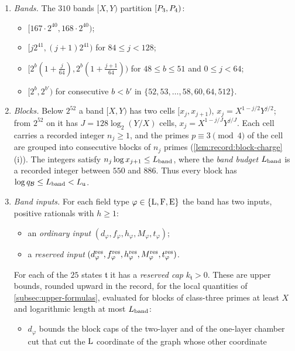 \begin{definition}\label{def:record:upper-bands}
\leavevmode
\begin{enumerate}[label=(\alph*)]
\item \emph{Bands.} The $310$ bands $[X,Y)$ partition $[P_3,P_4)$:
 \begin{itemize}
 \item $[167\cdot2^{40},168\cdot2^{40})$;
 \item $[j2^{41},(j+1)2^{41})$ for $84\le j<128$;
 \item $[2^b(1+\frac j{64}),2^b(1+\frac{j+1}{64}))$ for $48\le b\le51$ and
  $0\le j<64$;
 \item $[2^b,2^{b'})$ for consecutive $b<b'$ in $\{52,53,\dots,58,60,64,512\}$.
 \end{itemize}
\item \emph{Blocks.} Below $2^{52}$ a band $[X,Y)$ has two cells $[x_j,x_{j+1})$,
 $x_j=X^{1-j/2}Y^{j/2}$; from $2^{52}$ on it has $J=128\log_2(Y/X)$ cells,
 $x_j=X^{1-j/J}Y^{j/J}$. Each cell carries a recorded integer $n_j\ge1$, and the
 primes $p\equiv3\pmod4$ of the cell are grouped into consecutive blocks of $n_j$
 primes (\cref{lem:record:block-charge}(i)). The integers satisfy
 $n_j\log x_{j+1}\le L_{\rm band}$, where the \emph{band budget} $L_{\rm band}$ is a
 recorded integer between $550$ and $886$. Thus every block has
 $\log q_\mathcal B\le L_{\rm band}<L_{\rm u}$.
\item \emph{Band inputs.} For each field type $\varphi\in\{\rm L,F,E\}$ the band
 has two inputs, positive rationals with $h\ge1$:
 \begin{itemize}
 \item an \emph{ordinary input} $(d_\varphi,f_\varphi,h_\varphi,M_\varphi,t_\varphi)$;
 \item a \emph{reserved input} $(d^{\rm res}_\varphi,f^{\rm res}_\varphi,
  h^{\rm res}_\varphi,M^{\rm res}_\varphi,t^{\rm res}_\varphi)$.
 \end{itemize}
 For each of the $25$ states $\mathfrak t$ it has a \emph{reserved cap}
 $k_{\mathfrak t}>0$. These are upper bounds, rounded upward in the record, for the
 local quantities of \cref{subsec:upper-formulas}, evaluated for blocks of
 class-three primes at least $X$ and logarithmic length at most $L_{\rm band}$:
 \begin{itemize}
 \item $d_\varphi$ bounds the block caps of the two-layer and of the one-layer
  chamber cut that cut the $\rm L$ coordinate of the graph whose other coordinate

\end{itemize}
\end{enumerate}
\end{definition}
